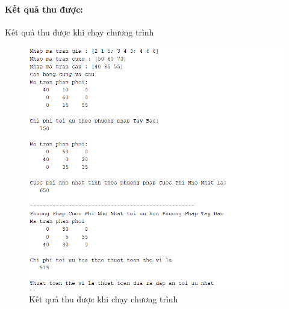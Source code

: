 \documentclass{article}
\begin{document}
\paragraph{Kết quả thu được:}
\begin{flushleft}
    \hspace{0.4cm}Kết quả thu được khi chạy chương trình
\end{flushleft}
\begin{figure}[ht]
    \centering
    \includegraphics[scale=0.8, frame]{Images/code1.png}
    \caption{Kết quả thu được khi chạy chương trình}
    \label{fig:enter-label}
\end{figure}
\newpage
\end{document}
